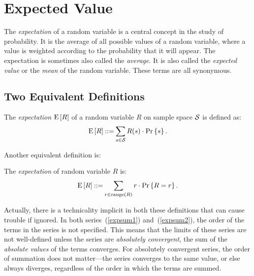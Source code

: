 \documentclass[11pt,twoside]{article}
\begin{document}
\section{Expected Value}

The \emph{expectation} of a random variable is a central concept in the
study of probability.  It is the average of all possible values of a
random variable, where a value is weighted according to the probability
that it will appear.  The expectation is sometimes also called the
\emph{average}.  It is also called the \emph{expected value} or the
\emph{mean} of the random variable.  These terms are all synonymous.

\subsection{Two Equivalent Definitions}

\begin{definition}\label{defexp1}
The \emph{expectation} $\mathop{\textup{E}}\nolimits\left[R\right]$ of a random variable $R$ on sample
space $\mathcal{S}$ is defined as:
\begin{equation}\label{expsum1}
\mathop{\textup{E}}\nolimits\left[R\right] \mathbin{::=} \sum_{s \in \mathcal{S}} R(s) \cdot \mathop{\textup{Pr}}\nolimits\left\{s\right\}.
\end{equation}
\end{definition}

Another equivalent definition is:
\begin{definition}\label{defexp2}
The \emph{expectation} of random variable $R$ is:
\begin{equation}\label{expsum2}
\mathop{\textup{E}}\nolimits\left[R\right] \mathbin{::=} \sum_{r \in \mathop{\textup{range}}\nolimits\left(R\right)} r \cdot \mathop{\textup{Pr}}\nolimits\left\{R = r\right\}.
\end{equation}
\end{definition}

Actually, there is a technicality implicit in both these definitions that
can cause trouble if ignored.  In both series~(\ref{expsum1})
and~(\ref{expsum2}), the order of the terms in the series is not
specified.  This means that the limits of these series are not
well-defined unless the series are \emph{absolutely convergent}, \ie the
sum of the \emph{absolute values} of the terms converges.  For absolutely
convergent series, the order of summation does not matter---the series
converges to the same value, or else always diverges, regardless of the
order in which the terms are summed.
\end{document}

